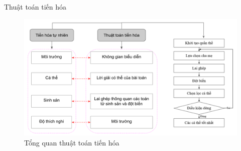     \begin{frame}{Thuật toán tiến hóa}
		\begin{figure}
            \centering
                \includegraphics[width=1.0\textwidth]{images/ea_.png}
            \caption{Tổng quan thuật toán tiến hóa}
            \label{fig:mfo}
        \end{figure}
	\end{frame}
	
